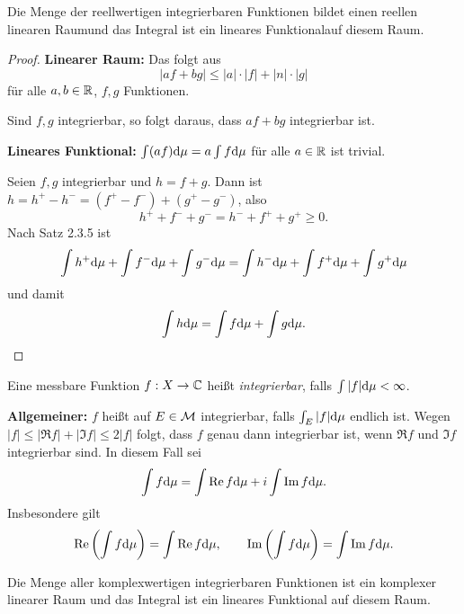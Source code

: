 \begin{lem}
 Die Menge der reellwertigen integrierbaren Funktionen bildet einen reellen linearen Raum\footnotemark und das Integral ist ein lineares Funktional\footnotemark auf diesem Raum.
\end{lem}
 \addtocounter{footnote}{-2} %

\begin{proof}
 \textbf{Linearer Raum:} Das folgt aus
 \[ | af + bg | \le |a| \cdot |f| + |n| \cdot |g| \]
 für alle $a,b \in \mathbb{R}$, $f,g$ Funktionen.
 
 Sind $f,g$ integrierbar, so folgt daraus, dass $af + bg$ integrierbar ist.
 
 \textbf{Lineares Funktional:} $\int (af) \mathrm{d} \mu = a \int f \mathrm{d} \mu$ für alle $a \in \mathbb{R}$ ist trivial.
 
 Seien $f,g$ integrierbar und $h = f+g$. Dann ist $h = h^+ - h^- = (f^+ - f^-) + (g^+ - g^-)$, also
 \[ h^+ + f^- + g^- = h^- + f^+ + g^+ \ge 0. \]
 Nach Satz 2.3.5 ist
 \[ \int h^+ \mathrm{d} \mu + \int f^- \mathrm{d} \mu + \int g^- \mathrm{d} \mu = \int h^- \mathrm{d} \mu + \int f^+ \mathrm{d} \mu + \int g^+ \mathrm{d} \mu \]
 und damit
 \[ \int h \mathrm{d} \mu = \int f \mathrm{d} \mu + \int g \mathrm{d} \mu. \qedhere \]
\end{proof}

\begin{defn}
 Eine messbare Funktion $f: X \to \mathbb{C}$ heißt \emph{integrierbar}, falls $\int |f| \mathrm{d} \mu < \infty$.
 
 \textbf{Allgemeiner:} $f$ heißt auf $E \in \mathcal{M}$ integrierbar, falls $\int_E |f| \mathrm{d} \mu$ endlich ist. Wegen $|f| \le |\Re f| + |\Im f| \le 2 |f|$ folgt, dass $f$ genau dann integrierbar ist, wenn $\Re f$ und $\Im f$ integrierbar sind. In diesem Fall sei
 \[ \int f \mathrm{d} \mu = \int \operatorname{Re} f \mathrm{d} \mu + i \int \operatorname{Im} f \mathrm{d} \mu. \]
 Insbesondere gilt
 \[ \operatorname{Re} \left( \int f \mathrm{d} \mu \right) = \int \operatorname{Re} f \mathrm{d} \mu, \qquad
    \operatorname{Im} \left( \int f \mathrm{d} \mu \right) = \int \operatorname{Im} f \mathrm{d} \mu. \]
\end{defn}

\begin{lem}
 Die Menge aller komplexwertigen integrierbaren Funktionen ist ein komplexer linearer Raum und das Integral ist ein lineares Funktional auf diesem Raum.
\end{lem}


